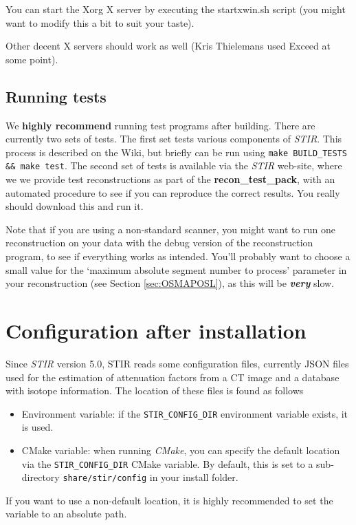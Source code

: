 \documentclass{article}
\begin{document}
You can start the Xorg X server by executing the startxwin.sh 
script (you might want to modify this a bit to suit your taste). 

Other decent X servers should work as well (Kris Thielemans used Exceed at 
some point).


\subsection{
Running tests}

We \textbf{highly recommend} running test programs after building. There are currently two
sets of tests. The first set tests various components of
\textit{STIR}. This process is described on the Wiki, but briefly can
be run using \texttt{make BUILD\_TESTS \&\& make test}.
The second set of tests is available via the \textit{STIR} web-site, where we 
we provide test reconstructions as part of the
\textbf{recon\_test\_pack}, with an 
automated procedure to see if you can reproduce the correct results. 
You really should download this and run it.


Note that if you are using a non-standard scanner, 
you might want to run one reconstruction on your data with 
the debug version of the reconstruction program, to see if everything 
works as intended. You'll probably want to choose a small value 
for the `maximum absolute segment number to process' parameter 
in your reconstruction (see Section \ref{sec:OSMAPOSL}), as this will be \textbf{\textit{very}} 
slow.


\section{Configuration after installation
\label{sec:configuration}
}
Since \textit{STIR} version 5.0, STIR reads some configuration files, currently JSON files used for
the estimation of attenuation factors from a CT image and a database with isotope information.
The location of these files is found as follows
\begin{itemize}
\item Environment variable: if the \texttt{STIR\_CONFIG\_DIR} environment variable exists, it is used.

\item CMake variable: when running \textit{CMake}, you can specify the default location via the
\texttt{STIR\_CONFIG\_DIR} CMake variable. By default, this is set to a sub-directory \texttt{share/stir/config}
in your install folder.
\end{itemize}
If you want to use a non-default location, it is highly recommended to set the variable to an absolute path.
\end{document}
